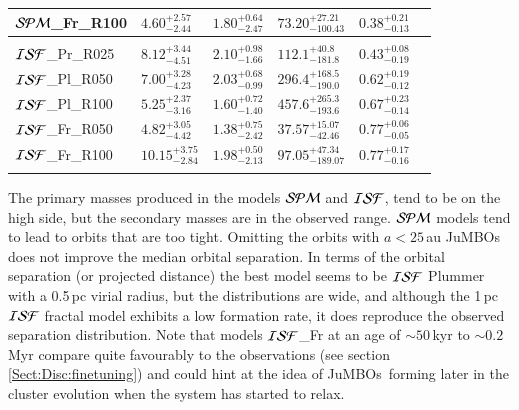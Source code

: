 \documentclass[submission,phys]{lib/SciPost}
\newcommand{\jumbos}{\mbox{JuMBOs}}
\begin{document}
\begin{table}
\begin{tabular}{llllll}
 ${\cal SPM}$\_Fr\_R100 & $4.60^{+2.57}_{-2.44}$ & $1.80^{+0.64}_{-2.47}$ & $73.20^{+27.21}_{-100.43}$ & $0.38^{+0.21}_{-0.13}$ \vspace{0.25em}\\
 \hline \vspace{-0.75em} \\ 
 ${\cal ISF}$\_Pr\_R025 & $8.12^{+3.44}_{-4.51}$ & $2.10^{+0.98}_{-1.66}$ & $112.1^{+40.8}_{-181.8}$ & $0.43^{+0.08}_{-0.19}$ \vspace{0.25em}\\
 ${\cal ISF}$\_Pl\_R050 & $7.00^{+3.28}_{-4.23}$ & $2.03^{+0.68}_{-0.99}$ & $296.4^{+168.5}_{-190.0}$ & $0.62^{+0.19}_{-0.12}$ \vspace{0.25em}\\
 ${\cal ISF}$\_Pl\_R100 & $5.25^{+2.37}_{-3.16}$ & $1.60^{+0.72}_{-1.40}$ & $457.6^{+265.3}_{-193.6}$ & $0.67^{+0.23}_{-0.14}$ \vspace{0.25em}\\
 ${\cal ISF}$\_Fr\_R050 & $4.82^{+3.05}_{-4.42}$ & $1.38^{+0.75}_{-2.42}$ & $37.57^{+15.07}_{-42.46}$ & $0.77^{+0.06}_{-0.05}$ \vspace{0.25em}\\  
 ${\cal ISF}$\_Fr\_R100 &$10.15^{+3.75}_{-2.84}$ & $1.98^{+0.50}_{-2.13}$ & $97.05^{+47.34}_{-189.07}$ & $0.77^{+0.17}_{-0.16}$ \vspace{0.25em}\\
 \hline \vspace{-0.75em} \\ 
 \end{tabular}
\end{table}

The primary masses produced in the models ${\cal SPM}$ and ${\cal
  ISF}$, tend to be on the high side, but the secondary masses are in
the observed range. ${\cal SPM}$ models tend to lead to orbits that
are too tight. Omitting the orbits with $a<25$\,au \jumbos\, does not
improve the median orbital separation.  In terms of the orbital
separation (or projected distance) the best model seems to be ${\cal
  ISF}$ Plummer with a 0.5\,pc virial radius, but the distributions
are wide, and although the 1\,pc ${\cal ISF}$ fractal model exhibits a
low formation rate, it does reproduce the observed separation
distribution. Note that models ${\cal ISF}$\_Fr at an age of
$\sim50$\,kyr to $\sim0.2$ Myr compare quite favourably to the
observations (see section\,\ref{Sect:Disc:finetuning}) and could hint
at the idea of \jumbos\ forming later in the cluster evolution when
the system has started to relax.
\end{document}
